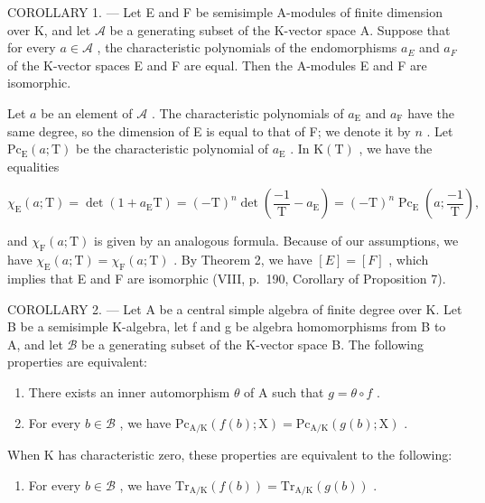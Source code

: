 COROLLARY 1. --- Let E and F be semisimple A-modules of finite dimension over K, and let \(\mathcal{A}\) be a generating subset of the K-vector space A. Suppose that for every \(a \in \mathcal{A}\) , the characteristic polynomials of the endomorphisms \(a_{E}\) and \(a_{F}\) of the K-vector spaces E and F are equal. Then the A-modules E and F are isomorphic.

Let \(a\) be an element of \(\mathcal{A}\) . The characteristic polynomials of \(a_{\mathrm{E}}\) and \(a_{\mathrm{F}}\) have the same degree, so the dimension of E is equal to that of F; we denote it by \(n\) . Let \(\mathrm{Pc}_{\mathrm{E}}(a;\mathrm{T})\) be the characteristic polynomial of \(a_{\mathrm{E}}\) . In \(\mathrm{K(T)}\) , we have the equalities

\[
\chi_ {\mathrm{E}} (a; \mathrm{T}) = \det \left(1 + a _ {\mathrm{E}} \mathrm{T}\right) = (- \mathrm{T}) ^ {n} \det \left(\frac {- 1}{\mathrm{T}} - a _ {\mathrm{E}}\right) = (- \mathrm{T}) ^ {n} \operatorname{Pc} _ {\mathrm{E}} \left(a; \frac {- 1}{\mathrm{T}}\right),
\]

and \(\chi_{\mathrm{F}}(a;\mathrm{T})\) is given by an analogous formula. Because of our assumptions, we have \(\chi_{\mathrm{E}}(a;\mathrm{T})=\chi_{\mathrm{F}}(a;\mathrm{T})\) . By Theorem 2, we have \([E]=[F]\) , which implies that E and F are isomorphic (VIII, p.~190, Corollary of Proposition 7).

COROLLARY 2. --- Let A be a central simple algebra of finite degree over K. Let B be a semisimple K-algebra, let f and g be algebra homomorphisms from B to A, and let \(\mathcal{B}\) be a generating subset of the K-vector space B. The following properties are equivalent:

\begin{enumerate}
\def\labelenumi{(\roman{enumi})}
\item
  There exists an inner automorphism \(\theta\) of A such that \(g = \theta \circ f\) .
\item
  For every \(b \in \mathcal{B}\) , we have \(\mathrm{Pc}_{\mathrm{A / K}}(f(b); \mathrm{X}) = \mathrm{Pc}_{\mathrm{A / K}}(g(b); \mathrm{X})\) .
\end{enumerate}

When \(\mathrm{K}\) has characteristic zero, these properties are equivalent to the following:

\begin{enumerate}
\def\labelenumi{(\roman{enumi})}
\setcounter{enumi}{2}
\tightlist
\item
  For every \(b \in \mathcal{B}\) , we have \(\mathrm{Tr}_{\mathrm{A / K}}(f(b)) = \mathrm{Tr}_{\mathrm{A / K}}(g(b))\) .
\end{enumerate}


